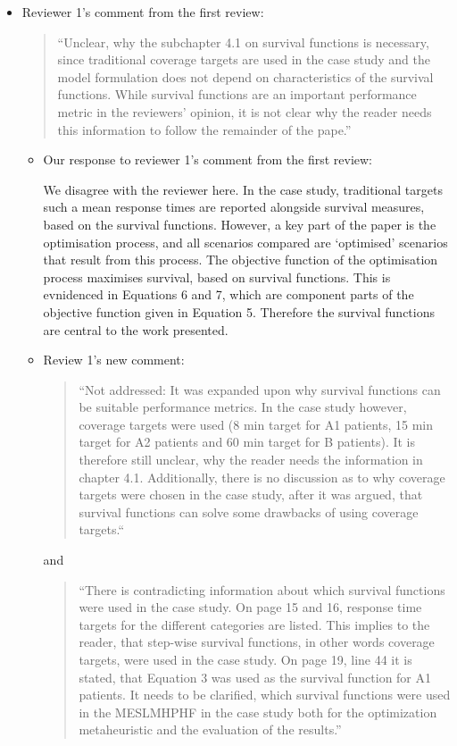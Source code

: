 \documentclass{article}
\begin{document}
\begin{itemize}
    \item Reviewer 1's comment from the first review:

    \begin{quote}
    ``Unclear, why the subchapter 4.1 on survival functions is necessary, since traditional coverage targets are used in the case study and the model formulation does not depend on characteristics of the survival functions. While survival functions are an important performance metric in the reviewers' opinion, it is not clear why the reader needs this information to follow the remainder of the pape.''
    \end{quote}
    
    \begin{itemize}
        \item Our response to reviewer 1's comment from the first review:

        We disagree with the reviewer here. In the case study, traditional targets such a mean response times are reported alongside survival measures, based on the survival functions. However, a key part of the paper is the optimisation process, and all scenarios compared are `optimised' scenarios that result from this process. The objective function of the optimisation process maximises survival, based on survival functions. This is evnidenced in Equations 6 and 7, which are component parts of the objective function given in Equation 5. Therefore the survival functions are central to the work presented.

        \item Review 1's new comment:

        \begin{quote}
        ``Not addressed: It was expanded upon why survival functions can be suitable performance metrics. In the case study however, coverage targets were used (8 min target for A1 patients, 15 min target for A2 patients and 60 min target for B patients). It is therefore still unclear, why the reader needs the information in chapter 4.1. Additionally, there is no discussion as to why coverage targets were chosen in the case study, after it was argued, that survival functions can solve some drawbacks of using coverage targets.``
        \end{quote}

        and

        \begin{quote}
        ``There is contradicting information about which survival functions were used in the case study. On page 15 and 16, response time targets for the different categories are listed. This implies to the reader, that step-wise survival functions, in other words coverage targets, were used in the case study. On page 19, line 44 it is stated, that Equation 3 was used as the survival function for A1 patients. It needs to be clarified, which survival functions were used in the MESLMHPHF in the case study both for the optimization metaheuristic and the evaluation of the results.''
        \end{quote}


\end{itemize}
\end{itemize}
\end{document}
